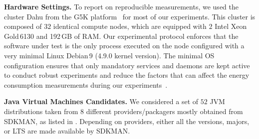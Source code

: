 \vspace{6pt}
\noindent\textbf{Hardware Settings.}
To report on reproducible measurements, we used the cluster \textsf{Dahu} from the G5K platform~\cite{grid5000} for most of our experiments.
This cluster is composed of $32$ identical compute nodes, which are equipped with $2$ Intel Xeon\,Gold\,6130 and 192\,GB of RAM.
Our experimental protocol enforces that the software under test is the only process executed on the node configured with a very minimal Linux Debian\,9 (4.9.0 kernel version).
The minimal OS configuration ensures that only mandatory services and daemons are kept active to conduct robust experiments and reduce the factors that can affect the energy consumption measurements during our experiments~\cite{opaper}.

\vspace{6pt}
\noindent\textbf{Java Virtual Machines Candidates.}
We considered a set of $52$ JVM distributions taken from $8$ different providers/packagers mostly obtained from \textsf{SDKMAN}, as listed in .
Depending on providers, either all the versions, majors, or LTS are made available by \textsf{SDKMAN}.


